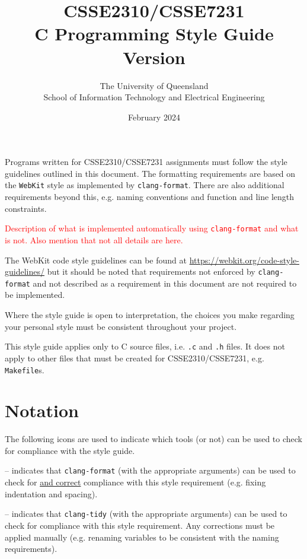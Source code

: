 \documentclass{article}
\title{CSSE2310/CSSE7231\\C Programming Style Guide\\Version \versionNum}
\author{The University of Queensland\\School of Information Technology and Electrical Engineering}
\date{February 2024}
\newcommand{\icon}[1]{\raisebox{-3pt}{\texttt{[image: icons/\#1.png]}}}
\begin{document}
\maketitle
\thispagestyle{plain}
\linenumbers

\lstset{numbers=left, numberstyle=\ttfamily}

Programs written for CSSE2310/CSSE7231 assignments must follow the style guidelines outlined in this document. The formatting requirements are based on the \texttt{WebKit} style as implemented by \texttt{clang-format}. There are also
additional requirements beyond this, e.g. naming conventions and function and line length constraints. 

\textcolor{red}{Description of what is implemented automatically using \texttt{clang-format} and what is not. Also mention that not all details are here.}

The WebKit code style guidelines can be found at \url{https://webkit.org/code-style-guidelines/} but it should be
noted that requirements not enforced by \texttt{clang-format} and not described as a requirement in this document
are not required to be implemented.

Where the style guide is open to interpretation, the choices you make regarding your personal style 
must be consistent throughout your project.

This style guide applies only to C source files, i.e. \texttt{.c} and \texttt{.h} files. It does not apply to other files
that must be created for CSSE2310/CSSE7231, e.g. \texttt{Makefile}s. 

\section{Notation}
The following icons are used to indicate which tools (or not) can be used to check for compliance with the style guide.

\noindent\icon{CLANG-FORMAT} -- indicates that \texttt{clang-format} (with the appropriate arguments) can be used to check for \ul{and correct} compliance with this style requirement (e.g. fixing indentation and spacing).

\noindent\icon{CLANG-TIDY} -- indicates that \texttt{clang-tidy} (with the appropriate arguments) can be used to check for compliance with this style requirement. Any corrections must be applied manually (e.g. renaming variables to be consistent with the naming requirements).
\end{document}
